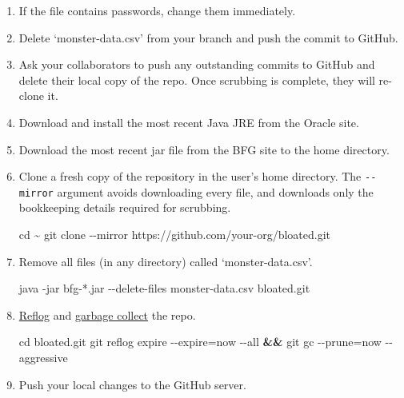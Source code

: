 \documentclass[
]{book}
\newenvironment{Shaded}{\begin{snugshade}}{\end{snugshade}}
\newcommand{\BuiltInTok}[1]{#1}
\newcommand{\ExtensionTok}[1]{#1}
\newcommand{\FunctionTok}[1]{\textcolor[rgb]{0.00,0.00,0.00}{#1}}
\newcommand{\KeywordTok}[1]{\textcolor[rgb]{0.13,0.29,0.53}{\textbf{#1}}}
\newcommand{\NormalTok}[1]{#1}
\begin{document}
\begin{enumerate}
\def\labelenumi{\arabic{enumi}.}
\item
  If the file contains passwords, change them immediately.
\item
  Delete `monster-data.csv' from your branch and push the commit to GitHub.
\item
  Ask your collaborators to push any outstanding commits to GitHub and delete their local copy of the repo. Once scrubbing is complete, they will re-clone it.
\item
  Download and install the most recent Java JRE from the Oracle site.
\item
  Download the most recent jar file from the BFG site to the home directory.
\item
  Clone a fresh copy of the repository in the user's home directory. The \texttt{-\/-mirror} argument avoids downloading every file, and downloads only the bookkeeping details required for scrubbing.

\begin{Shaded}
\begin{Highlighting}[]
\BuiltInTok{cd}\NormalTok{ \textasciitilde{}}
\FunctionTok{git}\NormalTok{ clone {-}{-}mirror https://github.com/your{-}org/bloated.git}
\end{Highlighting}
\end{Shaded}
\item
  Remove all files (in any directory) called `monster-data.csv'.

\begin{Shaded}
\begin{Highlighting}[]
\ExtensionTok{java}\NormalTok{ {-}jar bfg{-}*.jar {-}{-}delete{-}files monster{-}data.csv bloated.git}
\end{Highlighting}
\end{Shaded}
\item
  \href{https://git-scm.com/docs/git-reflog}{Reflog} and \href{https://git-scm.com/docs/git-gc}{garbage collect} the repo.

\begin{Shaded}
\begin{Highlighting}[]
\BuiltInTok{cd}\NormalTok{ bloated.git}
\FunctionTok{git}\NormalTok{ reflog expire {-}{-}expire=now {-}{-}all }\KeywordTok{\&\&} \FunctionTok{git}\NormalTok{ gc {-}{-}prune=now {-}{-}aggressive}
\end{Highlighting}
\end{Shaded}
\item
  Push your local changes to the GitHub server.


\end{enumerate}
\end{document}
